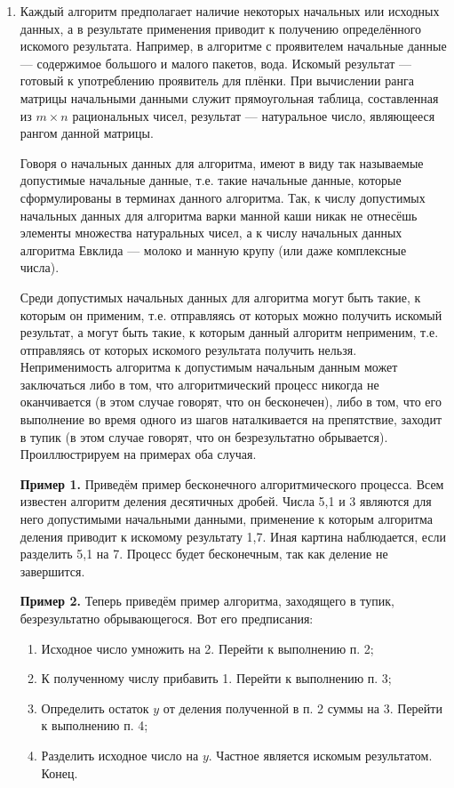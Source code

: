 \documentclass[a4paper,12pt]{article}
\begin{document}
\begin{enumerate}
    \item Каждый алгоритм предполагает наличие некоторых начальных или исходных данных, а в результате применения приводит к получению определённого искомого результата. Например, в алгоритме с проявителем начальные данные --- содержимое большого и малого пакетов, вода. Искомый результат --- готовый к употреблению проявитель для плёнки. При вычислении ранга матрицы начальными данными служит прямоугольная таблица, составленная из \(m \times n\) рациональных чисел, результат --- натуральное число, являющееся рангом данной матрицы.

    Говоря о начальных данных для алгоритма, имеют в виду так называемые допустимые начальные данные, т.е. такие начальные данные, которые сформулированы в терминах данного алгоритма. Так, к числу допустимых начальных данных для алгоритма варки манной каши никак не отнесёшь элементы множества натуральных чисел, а к числу начальных данных алгоритма Евклида --- молоко и манную крупу (или даже комплексные числа).

    Среди допустимых начальных данных для алгоритма могут быть такие, к которым он применим, т.е. отправляясь от которых можно получить искомый результат, а могут быть такие, к которым данный алгоритм неприменим, т.е. отправляясь от которых искомого результата получить нельзя. Неприменимость алгоритма к допустимым начальным данным может заключаться либо в том, что алгоритмический процесс никогда не оканчивается (в этом случае говорят, что он бесконечен), либо в том, что его выполнение во время одного из шагов наталкивается на препятствие, заходит в тупик (в этом случае говорят, что он безрезультатно обрывается). Проиллюстрируем на примерах оба случая.

    \textbf{Пример 1.} Приведём пример бесконечного алгоритмического процесса. Всем известен алгоритм деления десятичных дробей. Числа 5,1 и 3 являются для него допустимыми начальными данными, применение к которым алгоритма деления приводит к искомому результату 1,7. Иная картина наблюдается, если разделить 5,1 на 7. Процесс будет бесконечным, так как деление не завершится.

    \textbf{Пример 2.} Теперь приведём пример алгоритма, заходящего в тупик, безрезультатно обрывающегося. Вот его предписания:
    \begin{enumerate}
        \item Исходное число умножить на 2. Перейти к выполнению п. 2;
        \item К полученному числу прибавить 1. Перейти к выполнению п. 3;
        \item Определить остаток \(y\) от деления полученной в п. 2 суммы на 3. Перейти к выполнению п. 4;
        \item Разделить исходное число на \(y\). Частное является искомым результатом. Конец.
    \end{enumerate}


\end{enumerate}
\end{document}

